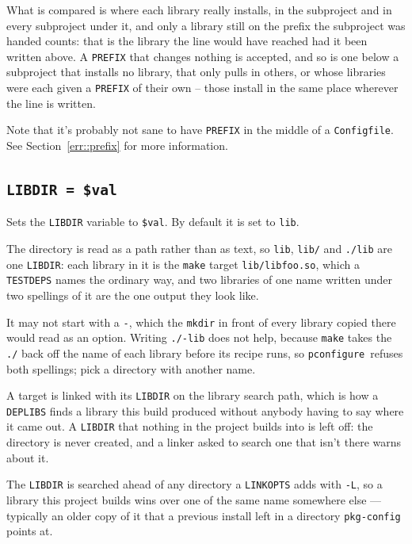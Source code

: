 \documentclass{article}
\newcommand{\pconfigure}{\texttt{pconfigure}}
\begin{document}
What is compared is where each library really installs, in the
subproject and in every subproject under it, and only a library still
on the prefix the subproject was handed counts: that is the library
the line would have reached had it been written above.  A
\texttt{PREFIX} that changes nothing is accepted, and so is one below a
subproject that installs no library, that only pulls in others, or
whose libraries were each given a \texttt{PREFIX} of their own --
those install in the same place wherever the line is written.

Note that it's probably not sane to have \texttt{PREFIX} in the middle
of a \texttt{Configfile}.  See Section~\ref{err::prefix} for more
information.

\subsection{\texttt{LIBDIR = \$val}}

Sets the \texttt{LIBDIR} variable to \texttt{\$val}.  By default it is
set to \texttt{lib}.

The directory is read as a path rather than as text, so
\texttt{lib}, \texttt{lib/} and \texttt{./lib} are one
\texttt{LIBDIR}: each library in it is the \texttt{make} target
\texttt{lib/libfoo.so}, which a \texttt{TESTDEPS} names the ordinary
way, and two libraries of one name written under two spellings of it
are the one output they look like.

It may not start with a \texttt{-}, which the \texttt{mkdir} in front
of every library copied there would read as an option.  Writing
\texttt{./-lib} does not help, because \texttt{make} takes the
\texttt{./} back off the name of each library before its recipe runs,
so \pconfigure\ refuses both spellings; pick a directory with another
name.

A target is linked with its \texttt{LIBDIR} on the library search
path, which is how a \texttt{DEPLIBS} finds a library this build
produced without anybody having to say where it came out.  A
\texttt{LIBDIR} that nothing in the project builds into is left off:
the directory is never created, and a linker asked to search one that
isn't there warns about it.

The \texttt{LIBDIR} is searched ahead of any directory a
\texttt{LINKOPTS} adds with \texttt{-L}, so a library this project
builds wins over one of the same name somewhere else --- typically an
older copy of it that a previous install left in a directory
\texttt{pkg-config} points at.
\end{document}
